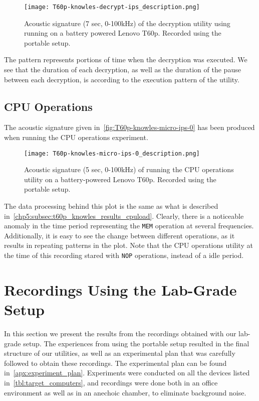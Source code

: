 \begin{figure}[ht]
    \centering
    \texttt{[image: T60p-knowles-decrypt-ips\_description.png]}
    \caption{Acoustic signature (7 sec, 0-100kHz) of the decryption utility using running on a battery powered Lenovo T60p.
        Recorded using the portable setup.}
    \label{fig:T60p-knowles-decrypt-ips}
\end{figure}

The pattern represents portions of time when the decryption was executed.
We see that the duration of each decryption, as well as the duration of the pause between each decryption, is according to the execution pattern of the utility.


\subsection{CPU Operations}\label{chp5:subsec:t60p_knowles_results_micro}
The acoustic signature given in~\autoref{fig:T60p-knowles-micro-ips-0} has been produced when running the CPU operations experiment.

\begin{figure}[ht]
    \centering
    \texttt{[image: T60p-knowles-micro-ips-0\_description.png]}
    \caption{Acoustic signature (5 sec, 0-100kHz) of running the CPU operations utility on a battery-powered Lenovo T60p.
        Recorded using the portable setup.}
    \label{fig:T60p-knowles-micro-ips-0}
\end{figure}

The data processing behind this plot is the same as what is described in~\autoref{chp5:subsec:t60p_knowles_results_cpuload}.
Clearly, there is a noticeable anomaly in the time period representing the \texttt{MEM} operation at several frequencies.
Additionally, it is easy to see the change between different operations, as it results in repeating patterns in the plot.
Note that the CPU operations utility at the time of this recording stared with \texttt{NOP} operations, instead of a idle period.



\section{Recordings Using the Lab-Grade Setup}\label{chp5:sec:bk_results}
In this section we present the results from the recordings obtained with our lab-grade setup.
The experiences from using the portable setup resulted in the final structure of our utilities, as well as an experimental plan that was carefully followed to obtain these recordings.
The experimental plan can be found in~\autoref{apx:experiment_plan}.
Experiments were conducted on all the devices listed in~\autoref{tbl:target_computers}, and recordings were done both in an office environment as well as in an anechoic chamber, to eliminate background noise.

